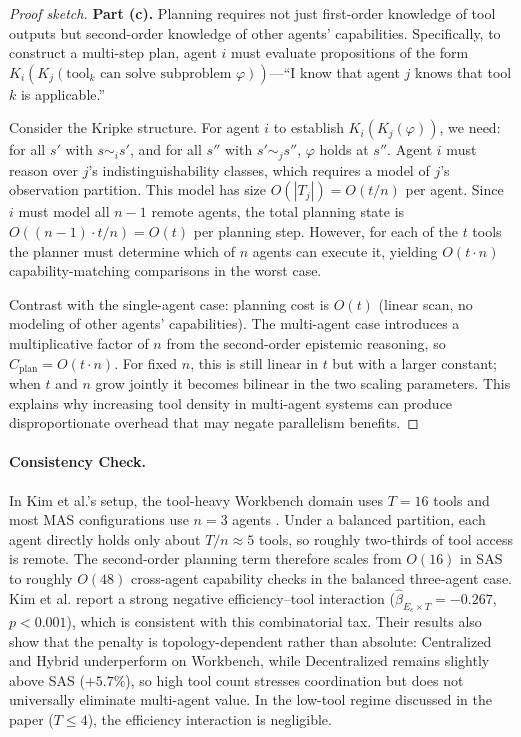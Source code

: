 \begin{proof}[Proof sketch]
\textbf{Part (c).} Planning requires not just first-order knowledge of tool outputs but second-order knowledge of other agents' capabilities. Specifically, to construct a multi-step plan, agent $i$ must evaluate propositions of the form $K_i(K_j(\mathrm{tool}_k \text{ can solve subproblem } \varphi))$---``I know that agent $j$ knows that tool $k$ is applicable.''

Consider the Kripke structure. For agent $i$ to establish $K_i(K_j(\varphi))$, we need: for all $s'$ with $s \sim_i s'$, and for all $s''$ with $s' \sim_j s''$, $\varphi$ holds at $s''$. Agent $i$ must reason over $j$'s indistinguishability classes, which requires a model of $j$'s observation partition. This model has size $O(|T_j|) = O(t/n)$ per agent. Since $i$ must model all $n-1$ remote agents, the total planning state is $O((n-1) \cdot t/n) = O(t)$ per planning step. However, for each of the $t$ tools the planner must determine which of $n$ agents can execute it, yielding $O(t \cdot n)$ capability-matching comparisons in the worst case.

Contrast with the single-agent case: planning cost is $O(t)$ (linear scan, no modeling of other agents' capabilities). The multi-agent case introduces a multiplicative factor of $n$ from the second-order epistemic reasoning, so $C_{\mathrm{plan}} = O(t \cdot n)$. For fixed $n$, this is still linear in $t$ but with a larger constant; when $t$ and $n$ grow jointly it becomes bilinear in the two scaling parameters. This explains why increasing tool density in multi-agent systems can produce disproportionate overhead that may negate parallelism benefits.
\end{proof}

\paragraph{Consistency Check.} In Kim et al.'s setup, the tool-heavy Workbench domain uses $T = 16$ tools and most MAS configurations use $n = 3$ agents \cite{kim2025scaling}. Under a balanced partition, each agent directly holds only about $T/n \approx 5$ tools, so roughly two-thirds of tool access is remote. The second-order planning term therefore scales from $O(16)$ in SAS to roughly $O(48)$ cross-agent capability checks in the balanced three-agent case. Kim et al. report a strong negative efficiency--tool interaction ($\hat{\beta}_{E_c \times T} = -0.267$, $p < 0.001$), which is consistent with this combinatorial tax. Their results also show that the penalty is topology-dependent rather than absolute: Centralized and Hybrid underperform on Workbench, while Decentralized remains slightly above SAS ($+5.7\%$), so high tool count stresses coordination but does not universally eliminate multi-agent value. In the low-tool regime discussed in the paper ($T \le 4$), the efficiency interaction is negligible.

